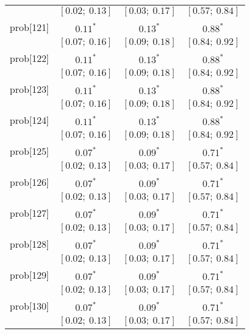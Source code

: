 \begin{table}
\begin{center}
\begin{tabular}{l c c c }
          & $[0.02;\ 0.13]$         & $[0.03;\ 0.17]$         & $[0.57;\ 0.84]$       \\
prob[121] & $0.11^{*}$              & $0.13^{*}$              & $0.88^{*}$            \\
          & $[0.07;\ 0.16]$         & $[0.09;\ 0.18]$         & $[0.84;\ 0.92]$       \\
prob[122] & $0.11^{*}$              & $0.13^{*}$              & $0.88^{*}$            \\
          & $[0.07;\ 0.16]$         & $[0.09;\ 0.18]$         & $[0.84;\ 0.92]$       \\
prob[123] & $0.11^{*}$              & $0.13^{*}$              & $0.88^{*}$            \\
          & $[0.07;\ 0.16]$         & $[0.09;\ 0.18]$         & $[0.84;\ 0.92]$       \\
prob[124] & $0.11^{*}$              & $0.13^{*}$              & $0.88^{*}$            \\
          & $[0.07;\ 0.16]$         & $[0.09;\ 0.18]$         & $[0.84;\ 0.92]$       \\
prob[125] & $0.07^{*}$              & $0.09^{*}$              & $0.71^{*}$            \\
          & $[0.02;\ 0.13]$         & $[0.03;\ 0.17]$         & $[0.57;\ 0.84]$       \\
prob[126] & $0.07^{*}$              & $0.09^{*}$              & $0.71^{*}$            \\
          & $[0.02;\ 0.13]$         & $[0.03;\ 0.17]$         & $[0.57;\ 0.84]$       \\
prob[127] & $0.07^{*}$              & $0.09^{*}$              & $0.71^{*}$            \\
          & $[0.02;\ 0.13]$         & $[0.03;\ 0.17]$         & $[0.57;\ 0.84]$       \\
prob[128] & $0.07^{*}$              & $0.09^{*}$              & $0.71^{*}$            \\
          & $[0.02;\ 0.13]$         & $[0.03;\ 0.17]$         & $[0.57;\ 0.84]$       \\
prob[129] & $0.07^{*}$              & $0.09^{*}$              & $0.71^{*}$            \\
          & $[0.02;\ 0.13]$         & $[0.03;\ 0.17]$         & $[0.57;\ 0.84]$       \\
prob[130] & $0.07^{*}$              & $0.09^{*}$              & $0.71^{*}$            \\
          & $[0.02;\ 0.13]$         & $[0.03;\ 0.17]$         & $[0.57;\ 0.84]$       \\

\end{tabular}
\end{center}
\end{table}
